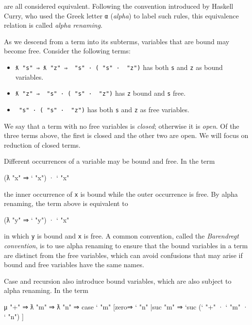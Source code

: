 are all considered equivalent. Following the convention introduced by
Haskell Curry, who used the Greek letter \texttt{α} (\emph{alpha}) to
label such rules, this equivalence relation is called \emph{alpha
renaming}.

As we descend from a term into its subterms, variables that are bound
may become free. Consider the following terms:

\begin{itemize}
\item
  \texttt{ƛ\ "s"\ ⇒\ ƛ\ "z"\ ⇒\ \textasciigrave{}\ "s"\ ·\ (\textasciigrave{}\ "s"\ ·\ \textasciigrave{}\ "z")}
  has both \texttt{s} and \texttt{z} as bound variables.
\item
  \texttt{ƛ\ "z"\ ⇒\ \textasciigrave{}\ "s"\ ·\ (\textasciigrave{}\ "s"\ ·\ \textasciigrave{}\ "z")}
  has \texttt{z} bound and \texttt{s} free.
\item
  \texttt{\textasciigrave{}\ "s"\ ·\ (\textasciigrave{}\ "s"\ ·\ \textasciigrave{}\ "z")}
  has both \texttt{s} and \texttt{z} as free variables.
\end{itemize}

We say that a term with no free variables is \emph{closed}; otherwise it
is \emph{open}. Of the three terms above, the first is closed and the
other two are open. We will focus on reduction of closed terms.

Different occurrences of a variable may be bound and free. In the term

\begin{myDisplay}
(ƛ "x" ⇒ ` "x") · ` "x"
\end{myDisplay}

the inner occurrence of \texttt{x} is bound while the outer occurrence
is free. By alpha renaming, the term above is equivalent to

\begin{myDisplay}
(ƛ "y" ⇒ ` "y") · ` "x"
\end{myDisplay}

in which \texttt{y} is bound and \texttt{x} is free. A common
convention, called the \emph{Barendregt convention}, is to use alpha
renaming to ensure that the bound variables in a term are distinct from
the free variables, which can avoid confusions that may arise if bound
and free variables have the same names.

Case and recursion also introduce bound variables, which are also
subject to alpha renaming. In the term

\begin{myDisplay}
μ "+" ⇒ ƛ "m" ⇒ ƛ "n" ⇒
  case ` "m"
    [zero⇒ ` "n"
    |suc "m" ⇒ `suc (` "+" · ` "m" · ` "n") ]
\end{myDisplay}

